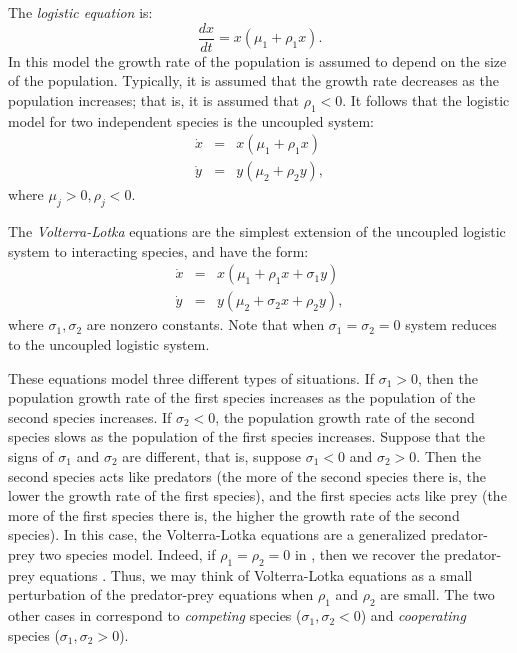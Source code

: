 \documentclass{ximera}
\begin{document}
The {\em logistic equation\/}  is:
\[
\frac{dx}{dt} = x(\mu_1 + \rho_1x).
\]
In this model the growth rate of the population is assumed to
depend on the size of the population.  Typically, it is assumed
that the growth rate decreases as the population increases; that
is, it is assumed that $\rho_1 < 0$.  It follows that the
logistic model for two independent species is the uncoupled system:
\begin{eqnarray*}
\dot{x} & = & x(\mu_1 + \rho_1x) \\
\dot{y} & = & y(\mu_2 + \rho_2y),
\end{eqnarray*}
where $\mu_j>0,\rho_j<0$.

The {\em Volterra-Lotka\/} equations 
are the simplest extension
of the uncoupled logistic system to interacting species, and
have the form:
\begin{equation} \label{e:pop2}
\begin{array}{rcl}
\dot{x} & = & x(\mu_1 +   \rho_1x + \sigma_1y) \\
\dot{y} & = & y(\mu_2 + \sigma_2x +   \rho_2y),
\end{array}
\end{equation}
where $\sigma_1,\sigma_2$ are nonzero constants.  Note that when
$\sigma_1=\sigma_2=0$ system  reduces to the
uncoupled logistic system. 

These equations model three different types of situations.  If
$\sigma_1>0$, then the population growth rate of the first species 
increases as the population of the second species increases.  If
$\sigma_2<0$, the population growth rate of the second species
slows as the population of the first species increases.
Suppose that the signs of $\sigma_1$ and $\sigma_2$ are
different, that is, suppose $\sigma_1<0$ and $\sigma_2>0$.  Then
the second species acts like predators (the more of the second
species there is, the lower the growth rate of the first
species), and the first species acts like prey (the more of
the first species there is, the higher the growth rate of the
second species).  In this case, the Volterra-Lotka equations are
a generalized predator-prey two species model.  Indeed,
if $\rho_1=\rho_2=0$ in , then we recover the
predator-prey equations .  Thus, we may think of
Volterra-Lotka equations as a small perturbation of the 
predator-prey equations when $\rho_1$ and $\rho_2$ are small.
The two other cases in  correspond to {\em competing\/} 
species ($\sigma_1,\sigma_2<0$) and 
{\em cooperating\/} species
($\sigma_1,\sigma_2>0$).
\end{document}
